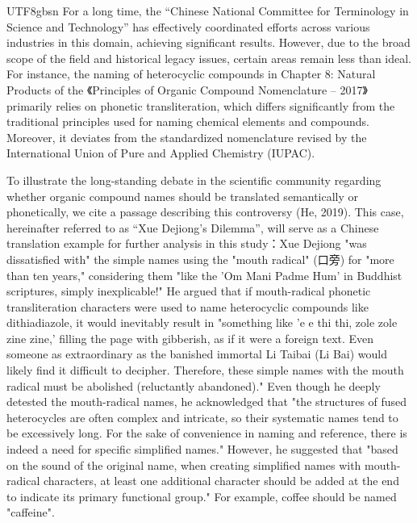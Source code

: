 \documentclass[conference]{IEEEtran}
\begin{document}
\begin{CJK*}{UTF8}{gbsn}
For a long time, the “Chinese National Committee for Terminology in Science and Technology” has effectively coordinated efforts across various industries in this domain, achieving significant results. However, due to the broad scope of the field and historical legacy issues, certain areas remain less than ideal. For instance, the naming of heterocyclic compounds in Chapter 8: Natural Products of the 《Principles of Organic Compound Nomenclature – 2017》 primarily relies on phonetic transliteration, which differs significantly from the traditional principles used for naming chemical elements and compounds. Moreover, it deviates from the standardized nomenclature revised by the International Union of Pure and Applied Chemistry (IUPAC). 

To illustrate the long-standing debate in the scientific community regarding whether organic compound names should be translated semantically or phonetically, we cite a passage describing this controversy (He, 2019). This case, hereinafter referred to as “Xue Dejiong’s Dilemma”, will serve as a Chinese translation example for further analysis in this study：Xue Dejiong "was dissatisfied with" the simple names using the "mouth radical" (口旁) for "more than ten years," considering them "like the 'Om Mani Padme Hum' in Buddhist scriptures, simply inexplicable!" He argued that if mouth-radical phonetic transliteration characters were used to name heterocyclic compounds like dithiadiazole, it would inevitably result in "something like 'e e thi thi, zole zole zine zine,' filling the page with gibberish, as if it were a foreign text. Even someone as extraordinary as the banished immortal Li Taibai (Li Bai) would likely find it difficult to decipher. Therefore, these simple names with the mouth radical must be abolished (reluctantly abandoned)." Even though he deeply detested the mouth-radical names, he acknowledged that "the structures of fused heterocycles are often complex and intricate, so their systematic names tend to be excessively long. For the sake of convenience in naming and reference, there is indeed a need for specific simplified names." However, he suggested that "based on the sound of the original name, when creating simplified names with mouth-radical characters, at least one additional character should be added at the end to indicate its primary functional group." For example, coffee should be named "caffeine".


\end{CJK*}
\end{document}
